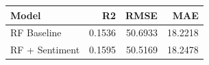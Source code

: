 \begin{table}[htbp]
\centering
\begin{tabular}{lrrr}
\toprule
Model & R2 & RMSE & MAE \\
\midrule
RF Baseline & 0.1536 & 50.6933 & 18.2218 \\
RF + Sentiment & 0.1595 & 50.5169 & 18.2478 \\
\bottomrule
\end{tabular}
\label{tab:rf_in_sample_fit}
\end{table}
